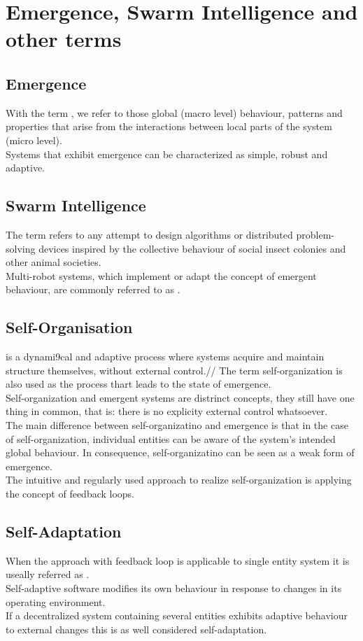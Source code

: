 \section{Emergence, Swarm Intelligence and other terms}
\subsection{Emergence}
With the term , we refer to those global (macro level) behaviour, patterns and properties that arise from the interactions between local parts of the system (micro level).\\
Systems that exhibit emergence can be characterized as simple, robust and adaptive.
\subsection{Swarm Intelligence}

The term  refers to any attempt to design algorithms or distributed problem-solving devices inspired by the collective behaviour of social insect colonies and other animal societies.\\
Multi-robot systems, which implement or adapt the concept of emergent behaviour, are commonly referred to as .
\subsection{Self-Organisation}
 is a dynami9cal and adaptive process where systems acquire and maintain structure themselves, without external control.//
The term self-organization is also used as the process thart leads to the state of emergence.\\
Self-organization and emergent systems are distrinct concepts, they still have one thing in common, that is: there is no explicity external control whatsoever.\\
The main difference between self-organizatino and emergence is that in the case of self-organization, individual entities can be aware of the system's intended global behaviour. In consequence, self-organizatino can be seen as a weak form of emergence.\\
The intuitive and regularly used approach to realize self-organization is applying the concept of feedback loops.

\subsection{Self-Adaptation}
When the approach with feedback loop is applicable to single entity system it is useally referred as .\\
Self-adaptive software modifies its own behaviour in response to changes in its operating environment.\\
If a decentralized system containing several entities exhibits adaptive behaviour to external changes this is as well considered self-adaptation.

